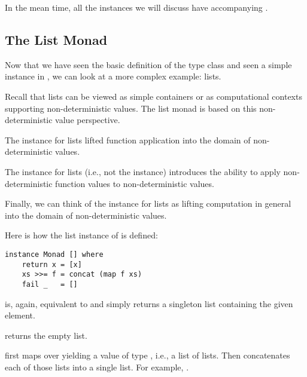 In the mean time, all the  instances we will discuss have accompanying .

\subsection{The List Monad}

Now that we have seen the basic definition of the  type class and seen a simple instance in , we
can look at a more complex example: lists.

Recall that lists can be viewed as simple containers or as computational contexts supporting non-deterministic values.
The list monad is based on this non-deterministic value perspective. 

\begin{notelist}
    \item The  instance for lists lifted function application into the domain of non-deterministic values.
    \item The  instance for lists (i.e., not the  instance) introduces the ability to
          apply non-deterministic function values to non-deterministic values.
    \item Finally, we can think of the  instance for lists as lifting computation in general into the
          domain of non-deterministic values.
\end{notelist}

Here is how the list instance of  is defined:

\begin{lstlisting}
instance Monad [] where  
    return x = [x]  
    xs >>= f = concat (map f xs)  
    fail _   = []  
\end{lstlisting}

\begin{notelist}
    \item {} is, again, equivalent to  and simply returns a singleton list containing the given element.
    \item {} returns the empty list.
    \item \code{(>>=)} first maps  over  yielding a value of type \code{[[a]]}, i.e., a list of lists.
          Then  concatenates each of those lists into a single list. For example,
          .
\end{notelist}

